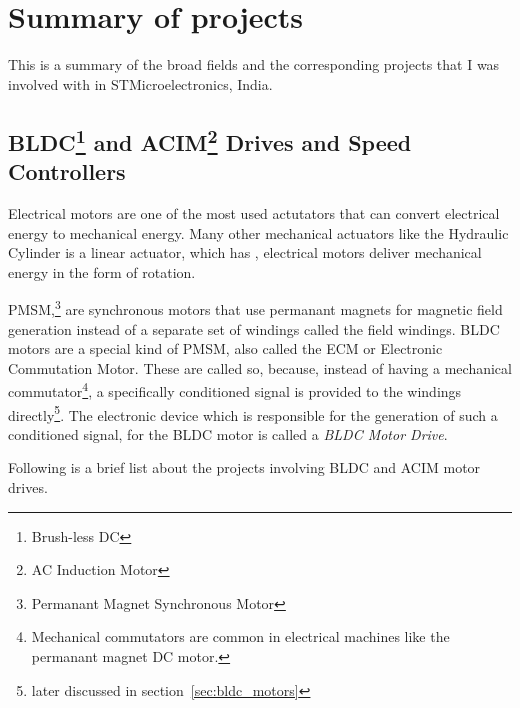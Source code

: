 \documentclass[]{book}
\begin{document}
\section{Summary of projects}\label{sec:proj_sum}

This is a summary of the broad fields and the corresponding projects
that I was involved with in STMicroelectronics, India.

\subsection[BLDC and ACIM Drives and Speed
Controllers]{\texorpdfstring{BLDC\footnote{Brush-less DC} and
ACIM\footnote{AC Induction Motor} Drives and Speed
Controllers}{BLDC and ACIM Drives and Speed Controllers}}\label{sec:bldc_sum}

Electrical motors are one of the most used actutators that can convert
electrical energy to mechanical energy. Many other mechanical actuators
like the Hydraulic Cylinder is a linear actuator, which has , electrical
motors deliver mechanical energy in the form of rotation.

PMSM,\footnote{Permanant Magnet Synchronous Motor} are synchronous
motors that use permanant magnets for magnetic field generation instead
of a separate set of windings called the field windings. BLDC motors are
a special kind of PMSM, also called the ECM or
Electronic Commutation Motor. These are called so, because, instead of
having a mechanical commutator\footnote{Mechanical commutators are
  common in electrical machines like the permanant magnet DC motor.}, a
specifically conditioned signal is provided to the windings
directly\footnote{later discussed in section~\ref{sec:bldc_motors}}. The
electronic device which is responsible for the generation of such a
conditioned signal, for the BLDC motor is called a \emph{BLDC Motor
Drive}.

Following is a brief list about the projects involving BLDC and ACIM
motor drives.
\end{document}
